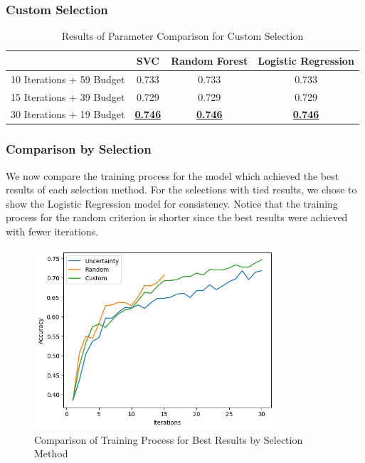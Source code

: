 \documentclass[12pt]{article}
\begin{document}
\subsubsection*{Custom Selection}

\begin{table}[H]
    \centering
    \begin{tabular}{|c|c|c|c|}
        \hline
        & SVC & Random Forest & Logistic Regression \\
        \hline
        10 Iterations + 59 Budget & 0.733 & 0.733 & 0.733 \\
        15 Iterations + 39 Budget & 0.729 & 0.729 & 0.729 \\
        30 Iterations + 19 Budget & \underline{\textbf{0.746}} & \underline{\textbf{0.746}} & \underline{\textbf{0.746}} \\
        \hline
    \end{tabular}
    \caption{Results of Parameter Comparison for Custom Selection}
\end{table}

\subsubsection*{Comparison by Selection}

We now compare the training process for the model which achieved the best results of each selection method. For the selections with tied results, we chose to show the Logistic Regression model for consistency.
Notice that the training process for the random criterion is shorter since the best results were achieved with fewer iterations.

\begin{figure}[H]
    \centering
    \includegraphics[width=0.8\textwidth]{criterion_comparison.png}
    \caption{Comparison of Training Process for Best Results by Selection Method}
\end{figure}
\end{document}
